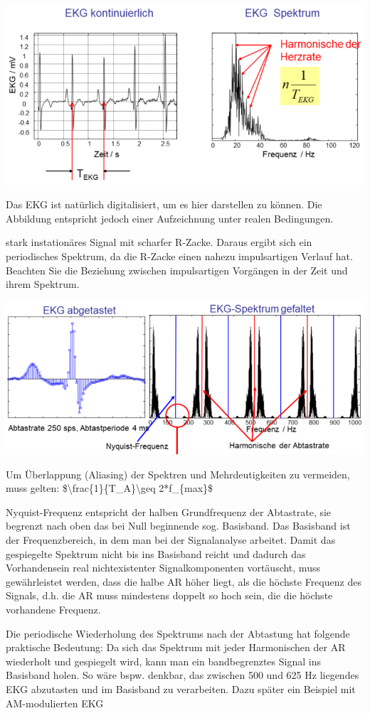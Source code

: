 \documentclass[a4paper]{article}
\begin{document}
\begin{multicols}{3}
  \includegraphics[width=.5\linewidth]{Assets/Biosignalverarbeitung-EKG-kontinuierlich-spektrum.png}

  \begin{itemize*}
    \item Das EKG ist natürlich digitalisiert, um es hier darstellen zu können. Die Abbildung entspricht jedoch einer Aufzeichnung unter realen Bedingungen.
    \item stark instationäres Signal mit scharfer R-Zacke. Daraus ergibt sich ein periodisches Spektrum, da die R-Zacke einen nahezu impulsartigen Verlauf hat. Beachten Sie die Beziehung zwischen impulsartigen Vorgängen in der Zeit und ihrem Spektrum.
  \end{itemize*}

  \includegraphics[width=.5\linewidth]{Assets/Biosignalverarbeitung-EKG-tasten-falten.png}

  \begin{itemize*}
    \item Um Überlappung (Aliasing) der Spektren und Mehrdeutigkeiten zu vermeiden, muss gelten: \$\textbackslash frac\{1\}\{T\_A\}\textbackslash geq 2*f\_\{max\}\$
    \item Nyquist-Frequenz entspricht der halben Grundfrequenz der Abtastrate, sie begrenzt nach oben das bei Null beginnende sog. Basisband. Das Basisband ist der Frequenzbereich, in dem man bei der Signalanalyse arbeitet. Damit das gespiegelte Spektrum nicht bis ins Basisband reicht und dadurch das Vorhandensein real nichtexistenter Signalkomponenten vortäuscht, muss gewährleistet werden, dass die halbe AR höher liegt, als die höchste Frequenz des Signals, d.h. die AR muss mindestens doppelt so hoch sein, die die höchste vorhandene Frequenz.
    \item Die periodische Wiederholung des Spektrums nach der Abtastung hat folgende praktische Bedeutung: Da sich das Spektrum mit jeder Harmonischen der AR wiederholt und gespiegelt wird, kann man ein bandbegrenztes Signal ins Basisband holen. So wäre bspw. denkbar, das zwischen 500 und 625 Hz liegendes EKG abzutasten und im Basisband zu verarbeiten. Dazu später ein Beispiel mit AM-modulierten EKG
  \end{itemize*}


\end{multicols}
\end{document}
